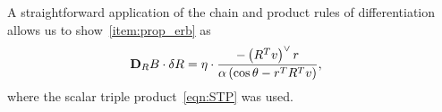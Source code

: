 \documentclass[letterpaper, 10 pt, conference]{ieeeconf}  %
\begin{document}
A straightforward application of the chain and product rules of differentiation allows us to show~\cref{item:prop_erb} as
\begin{align*}
	\mathbf{D}_{R} B \cdot \delta R &=  \eta \cdot \frac{ - \left( R^T v\right)^\vee r}{\alpha \left(\cos \theta - r^T R^T v \right)} ,
\end{align*}
where the scalar triple product~\cref{eqn:STP} was used.

\end{document}
